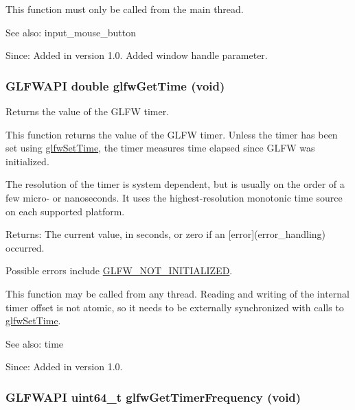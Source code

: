 This function must only be called from the main thread.

\begin{Desc}
\item[See also:]input\_\-mouse\_\-button\end{Desc}
\begin{Desc}
\item[Since:]Added in version 1.0.  Added window handle parameter. \end{Desc}
\hypertarget{group__input_g03d4a1039b8662c71eeb40beea8cb622}{
\subsubsection[glfwGetTime]{\setlength{\rightskip}{0pt plus 5cm}GLFWAPI double glfwGetTime (void)}}
\label{group__input_g03d4a1039b8662c71eeb40beea8cb622}


Returns the value of the GLFW timer. 

This function returns the value of the GLFW timer. Unless the timer has been set using \hyperlink{group__input_g94360a3628a09f32708f83cc3fa48590}{glfwSetTime}, the timer measures time elapsed since GLFW was initialized.

The resolution of the timer is system dependent, but is usually on the order of a few micro- or nanoseconds. It uses the highest-resolution monotonic time source on each supported platform.

\begin{Desc}
\item[Returns:]The current value, in seconds, or zero if an \mbox{[}error\mbox{]}(error\_\-handling) occurred.\end{Desc}
Possible errors include \hyperlink{group__errors_g2374ee02c177f12e1fa76ff3ed15e14a}{GLFW\_\-NOT\_\-INITIALIZED}.

This function may be called from any thread. Reading and writing of the internal timer offset is not atomic, so it needs to be externally synchronized with calls to \hyperlink{group__input_g94360a3628a09f32708f83cc3fa48590}{glfwSetTime}.

\begin{Desc}
\item[See also:]time\end{Desc}
\begin{Desc}
\item[Since:]Added in version 1.0. \end{Desc}
\hypertarget{group__input_ga92d10b10013372778efbf6367714371}{
\subsubsection[glfwGetTimerFrequency]{\setlength{\rightskip}{0pt plus 5cm}GLFWAPI uint64\_\-t glfwGetTimerFrequency (void)}}
\label{group__input_ga92d10b10013372778efbf6367714371}


